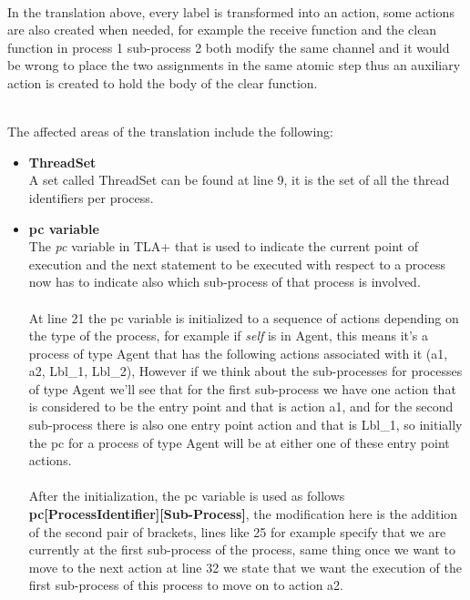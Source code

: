 \documentclass{thesul}
\begin{document}
\hfill\\
In the translation above, every label is transformed into an action, some actions are also created when needed, for example the receive function and the clean function in process 1 sub-process 2 both modify the same channel and it would be wrong to place the two assignments in the same atomic step thus an auxiliary action is created to hold the body of the clear function.

\hfill\\

The affected areas of the translation include the following:
\begin{itemize}

\item \textbf{ThreadSet}
\hfill\\
A set called ThreadSet can be found at line 9, it is the set of all the thread identifiers per process.

\item \textbf{pc variable}
\hfill\\
The \textit{pc} variable in TLA+ that is used to indicate the current point of execution and the next statement to be executed with respect to a process now has to indicate also which sub-process of that process is involved.
\hfill\\
\hfill\\
At line 21 the pc variable is initialized to a sequence of actions depending on the type of the process, for example if \textit{self} is in Agent, this means it's a process of type Agent that has the following actions associated with it (a1, a2, Lbl\_1, Lbl\_2), However if we think about the sub-processes for processes of type Agent we'll see that for the first sub-process we have one action that is considered to be the entry point and that is action a1, and for the second sub-process there is also one entry point action and that is Lbl\_1, so initially the pc for a process of type Agent will be at either one of these entry point actions.
\hfill\\
\hfill\\
After the initialization, the pc variable is used as follows \textbf{pc[ProcessIdentifier][Sub-Process]}, the modification here is the addition of the second pair of brackets, lines like 25 for example specify that we are currently at the first sub-process of the process, same thing once we want to move to the next action at line 32 we state that we want the execution of the first sub-process of this process to move on to action a2.

\end{itemize}
\end{document}

